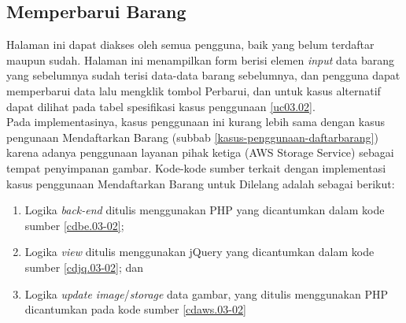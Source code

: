 \subsection{Memperbarui Barang}
Halaman ini dapat diakses oleh semua pengguna, baik yang belum terdaftar maupun sudah. Halaman ini menampilkan form berisi elemen \textit{input} data barang yang sebelumnya sudah terisi data-data barang sebelumnya, dan pengguna dapat memperbarui data lalu mengklik tombol Perbarui, dan untuk kasus alternatif dapat dilihat pada tabel spesifikasi kasus penggunaan \ref{uc03.02}.\\
\indent Pada implementasinya, kasus penggunaan ini kurang lebih sama dengan kasus pengunaan Mendaftarkan Barang (subbab \ref{kasus-penggunaan-daftarbarang}) karena adanya penggunaan layanan pihak ketiga (AWS Storage Service) sebagai tempat penyimpanan gambar. Kode-kode sumber terkait dengan implementasi kasus penggunaan Mendaftarkan Barang untuk Dilelang adalah sebagai berikut:
\begin{enumerate}
	\item Logika \textit{back-end} ditulis menggunakan PHP yang dicantumkan dalam kode sumber \ref{cdbe.03-02}; 
	\item Logika \textit{view} ditulis menggunakan jQuery yang dicantumkan dalam kode sumber \ref{cdjq.03-02}; dan
	\item Logika \textit{update image}/\textit{storage} data gambar, yang ditulis menggunakan PHP dicantumkan pada kode sumber \ref{cdaws.03-02}
\end{enumerate} 

